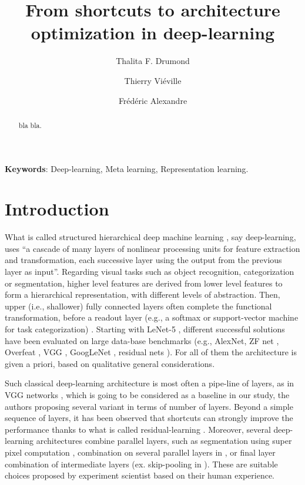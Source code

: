 \documentclass[twocolumn]{article}
\title{From shortcuts to architecture optimization in deep-learning}
\author[1]{Thalita F. Drumond}
\author[1]{Thierry Vi\'eville}
\author[1]{Fr\'ed\'eric Alexandre}
\affil[1]{Mnemosyne team, INRIA Bordeaux}
\begin{document}
\maketitle

\begin{abstract}
  bla bla.
\end{abstract}
\medskip

\noindent\textbf{Keywords}: Deep-learning, Meta learning, Representation learning.

\section*{Introduction}

What is called structured hierarchical deep machine learning \cite{Deng2013Deep}, say deep-learning, uses ``a cascade of many layers of nonlinear processing units for feature extraction and transformation, each successive layer using the output from the previous layer as input''. Regarding visual tasks such as object recognition, categorization or segmentation, higher level features are derived from lower level features to form a hierarchical representation, with different levels of abstraction. Then, upper (i.e., shallower) fully connected layers often complete the functional transformation, before a readout layer (e.g., a softmax or support-vector machine for task categorization) \cite{Srinivas2016Taxonomy}. Starting with LeNet-5 \cite{Lecun1998Gradient}, different successful solutions have been evaluated on large data-base benchmarks (e.g., AlexNet\cite{Krizhevsky2012Imagenet}, ZF net \cite{Zeiler2014Visualizing}, Overfeat \cite{Sermanet2013Overfeat}, VGG \cite{Simonyan2015Very},  GoogLeNet \cite{Szegedy2014Going}, residual nets \cite{He2016Deep}). For all of them the architecture is given a priori, based on qualitative general considerations.

Such classical deep-learning architecture is most often a pipe-line of layers, as in VGG networks \cite{Simonyan2015Very}, which is going to be considered as a baseline in our study, the authors proposing several variant in terms of number of layers. Beyond a simple sequence of layers, it has been observed that shortcuts can strongly improve the performance thanks to what is called residual-learning \cite{He2016Deep}. Moreover, several deep-learning architectures combine parallel layers, such as segmentation using super pixel computation \cite{Farabet2013Learning}, combination on several parallel layers in \cite{Szegedy2014Going}, or final layer combination of intermediate layers (ex. skip-pooling in \cite{Shelhamer2016Fully}). These are suitable choices proposed by experiment scientist based on their human experience. 
\end{document}
